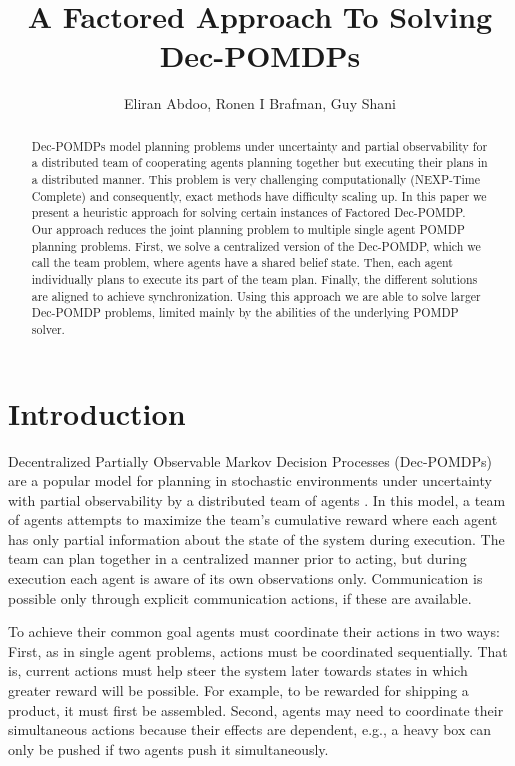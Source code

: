\documentclass[letterpaper]{article} %
\title{A Factored Approach To Solving Dec-POMDPs }
\author{Eliran Abdoo, Ronen I Brafman, Guy Shani}
\theoremstyle{definition}
\begin{document}
\maketitle

\begin{abstract}
Dec-POMDPs model planning problems under uncertainty and partial observability for a distributed team of cooperating agents planning together but executing their plans in a distributed manner. This problem is
very challenging computationally (NEXP-Time Complete) and consequently, exact methods have difficulty scaling up. In this paper we present a heuristic approach for solving certain instances of Factored Dec-POMDP. Our approach reduces the joint planning problem to multiple single agent POMDP planning problems.
First, we solve a centralized version of the Dec-POMDP, which we call the team problem, where agents have a shared belief state. Then, each agent individually plans to execute its part of the team plan. Finally, the different solutions are aligned to achieve synchronization. Using this approach we are able to solve larger Dec-POMDP problems, limited mainly by the abilities of the underlying POMDP solver.
\end{abstract}




\section{Introduction}

Decentralized Partially Observable Markov Decision Processes (Dec-POMDPs) are a popular model for planning in stochastic environments under uncertainty with partial observability by a distributed team of agents \cite{DECPOMDPART}. In this model, a team of agents attempts to maximize the team's cumulative reward where each agent has only partial information about the state of the system during execution.  The team can plan together in a centralized manner prior to acting, but during execution each agent is aware of its own observations only. Communication is possible only through explicit communication actions, if these are available. 

To achieve their common goal agents must coordinate their actions in two ways: First, as in single agent problems, actions must be coordinated sequentially. That is, current actions must help steer the system later towards states in which greater reward will be possible. For example, to be rewarded for shipping a product, it must first be assembled. 
Second, agents may need to coordinate their simultaneous actions because their effects are dependent, e.g., a heavy box can only be pushed if two agents push it simultaneously. 
\end{document}
